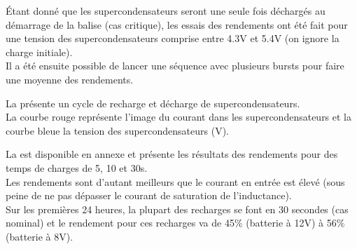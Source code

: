 Étant donné que les supercondensateurs seront une seule fois déchargés au démarrage de la balise (cas critique), les essais des rendements ont été fait pour une tension des supercondensateurs comprise entre 4.3V et 5.4V (on ignore la charge initiale).\\

Il a été ensuite possible de lancer une séquence avec plusieurs bursts pour faire une moyenne des rendements.


La  présente un cycle de recharge et décharge de supercondensateurs.\\
La courbe rouge représente l'image du courant dans les supercondensateurs et la courbe bleue la tension des supercondensateurs (V).


La  est disponible en annexe et présente les résultats des rendements pour des temps de charges de 5, 10 et 30s.\\ Les rendements sont d'autant meilleurs que le courant en entrée est élevé (sous peine de ne pas dépasser le courant de
saturation de l'inductance).\\
Sur les premières 24 heures, la plupart des recharges se font en 30 secondes (cas nominal) et le rendement pour ces recharges va de 45\% (batterie à 12V) à 56\% (batterie à 8V).




 
